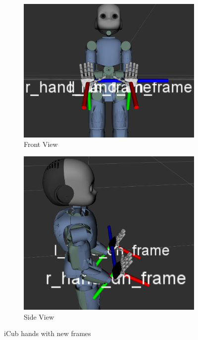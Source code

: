 \documentclass[12pt,a4paper]{report}
\begin{document}
\begin{figure}[H]
	\begin{subfigure}[b]{0.5\textwidth}
		\centering
		\includegraphics[scale=0.21]{figures/hands_front.png}
		\caption{Front View}
		\label{hands_front_view}
	\end{subfigure}
	\begin{subfigure}[b]{0.5\textwidth}
		\centering
		\includegraphics[scale=0.22]{figures/hands_side.png}
		\caption{Side View}
		\label{hands_side_view}
	\end{subfigure}
	\caption{iCub hands with new frames}
	\label{hands_frames}
\end{figure}
\end{document}

